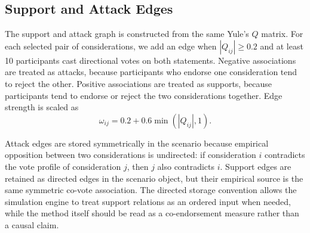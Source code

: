 \subsection{Support and Attack Edges}

The support and attack graph is constructed from the same Yule's $Q$ matrix.
For each selected pair of considerations, we add an edge when $|Q_{ij}| \geq
0.2$ and at least 10 participants cast directional votes on both statements.
Negative associations are treated as attacks, because participants who endorse
one consideration tend to reject the other. Positive associations are treated
as supports, because participants tend to endorse or reject the two
considerations together. Edge strength is scaled as
\[
\omega_{ij} = 0.2 + 0.6\min(|Q_{ij}|,1).
\]

Attack edges are stored symmetrically in the scenario because empirical
opposition between two considerations is undirected: if consideration $i$
contradicts the vote profile of consideration $j$, then $j$ also contradicts
$i$. Support edges are retained as directed edges in the scenario object, but
their empirical source is the same symmetric co-vote association. The directed
storage convention allows the simulation engine to treat support relations as
an ordered input when needed, while the method itself should be read as a
co-endorsement measure rather than a causal claim.

